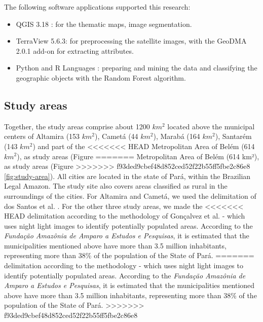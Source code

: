 \documentclass[preprint, 3p,
authoryear]{elsarticle} %
\begin{document}
The following software applications supported this research:

\begin{itemize}
\item
  QGIS 3.18 \citep{QGISTeam2021}: for the thematic maps, image
  segmentation.
\item
  TerraView 5.6.3: for preprocessing the satellite images, with the
  GeoDMA 2.0.1 add-on \citep{Korting2013} for extracting attributes.
\item
  Python \citep{vanRossum1995} and R Languages \citep{R2022} : preparing
  and mining the data and classifying the geographic objects with the
  Random Forest algorithm.
\end{itemize}

\hypertarget{study-areas}{%
\subsection{Study areas}\label{study-areas}}

Together, the study areas comprise about 1200 \(km^2\) located above the
municipal centers of Altamira (153 \(km^2\)), Cametá (44 \(km^2\)),
Marabá (164 \(km^2\)), Santarém (143 \(km^2\)) and part of the
<<<<<<< HEAD
Metropolitan Area of Belém (614 \(km^2\)), as study areas (Figure
=======
Metropolitan Area of Belém (614 km²), as study areas (Figure
>>>>>>> f93ded9cbef48d852ced52f22b55ff5fbe2c86e8
\ref{fig:study-area}). All cities are located in the state of Pará,
within the Brazilian Legal Amazon. The study site also covers areas
classified as rural in the surroundings of the cities. For Altamira and
Cametá, we used the delimitation of dos Santos et al.
\citeyearpar{Santos2022}. For the other three study areas, we made the
<<<<<<< HEAD
delimitation according to the methodology of Gonçalvez et al.
\citeyearpar{Goncalves2021} - which uses night light images to identify
potentially populated areas. According to the \emph{Fundação Amazônia de
Amparo a Estudos e Pesquisas}, it is estimated that the municipalities
mentioned above have more than 3.5 million inhabitants, representing
more than 38\% of the population of the State of Pará.
=======
delimitation according to the methodology \citep{Goncalves2021} - which
uses night light images to identify potentially populated areas.
According to the \emph{Fundação Amazônia de Amparo a Estudos e
Pesquisas}, it is estimated that the municipalities mentioned above have
more than 3.5 million inhabitants, representing more than 38\% of the
population of the State of Pará.
>>>>>>> f93ded9cbef48d852ced52f22b55ff5fbe2c86e8
\end{document}
